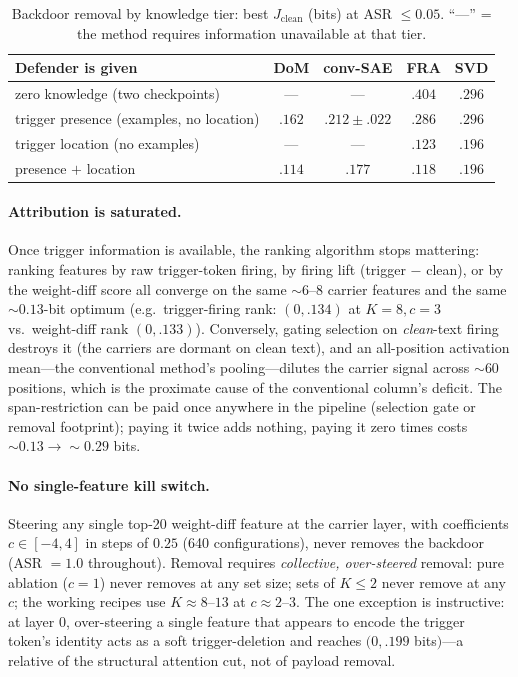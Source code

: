 \documentclass{article}
\theoremstyle{plain}
\theoremstyle{definition}
\theoremstyle{remark}
\begin{document}
\begin{table}[h]
\caption{Backdoor removal by knowledge tier: best $J_{\text{clean}}$ (bits) at ASR $\le 0.05$. ``---'' = the method requires information unavailable at that tier.}
\label{tab:fourway}
\centering
\small
\begin{tabular}{lcccc}
\toprule
Defender is given & DoM & conv-SAE & FRA & SVD \\
\midrule
zero knowledge (two checkpoints) & --- & --- & $.404$ & $\mathbf{.296}$ \\
trigger presence (examples, no location) & $\mathbf{.162}$ & $.212 \pm .022$ & $.286$ & $.296$ \\
trigger location (no examples) & --- & --- & $\mathbf{.123}$ & $.196$ \\
presence $+$ location & $\mathbf{.114}$ & $.177$ & $.118$ & $.196$ \\
\bottomrule
\end{tabular}
\end{table}

\paragraph{Attribution is saturated.} Once trigger information is available, the ranking algorithm stops mattering: ranking features by raw trigger-token firing, by firing lift (trigger $-$ clean), or by the weight-diff score all converge on the same ${\sim}6$--$8$ carrier features and the same ${\sim}0.13$-bit optimum (e.g.\ trigger-firing rank: $(0, .134)$ at $K{=}8, c{=}3$ vs.\ weight-diff rank $(0, .133)$). Conversely, gating selection on \emph{clean}-text firing destroys it (the carriers are dormant on clean text), and an all-position activation mean---the conventional method's pooling---dilutes the carrier signal across ${\sim}60$ positions, which is the proximate cause of the conventional column's deficit. The span-restriction can be paid once anywhere in the pipeline (selection gate or removal footprint); paying it twice adds nothing, paying it zero times costs ${\sim}0.13 \to {\sim}0.29$ bits.

\paragraph{No single-feature kill switch.} Steering any single top-20 weight-diff feature at the carrier layer, with coefficients $c \in [-4, 4]$ in steps of $0.25$ (640 configurations), never removes the backdoor (ASR $= 1.0$ throughout). Removal requires \emph{collective, over-steered} removal: pure ablation ($c{=}1$) never removes at any set size; sets of $K \le 2$ never remove at any $c$; the working recipes use $K \approx 8$--$13$ at $c \approx 2$--$3$. The one exception is instructive: at layer 0, over-steering a single feature that appears to encode the trigger token's identity acts as a soft trigger-deletion and reaches $(0, .199$ bits$)$---a relative of the structural attention cut, not of payload removal.
\end{document}
